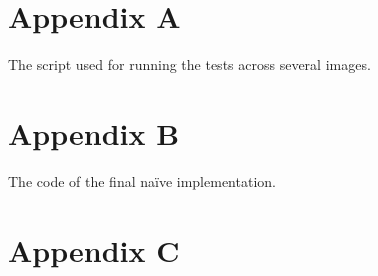 \chapter{Appendix A}
\label{AppA} 

The script used for running the tests across several images. 




\chapter{Appendix B}
\label{AppNaive} 

The code of the final na\"ive implementation. 












\chapter{Appendix C}
\label{AppLinePS1}

